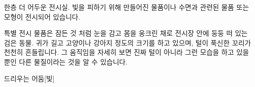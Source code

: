 \documentclass{report}
\begin{document}
	한층 더 어두운 전시실. 빛을 피하기 위해 만들어진 물품이나 수면과 관련된 물품 또는 모형이 전시되어 있습니다.
	
	특별 전시 물품은 잠든 것 처럼 눈을 감고 몸을 웅크린 채로 전시장 안에 둥둥 떠 있는 검은 동물. 귀가 길고 고양이나 강아지 정도의 크기를 하고 있으며, 털이 푹신한 꼬리가 천천히 흔들립니다. 그 움직임을 자세히 보면 진짜 털이 아니라 그런 모습을 하고 있을 뿐인 다른 물질이라는 것을 알 수 있습니다.
	
	\begin{story}{드리우는 어둠}{[빛]}
	\end{story}
\end{document}

